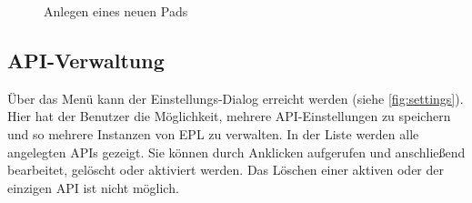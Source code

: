 \begin{figure}[h!]
    \centering
    \setlength\fboxsep{0pt}
	  \caption{Anlegen eines neuen Pads}
	  \label{fig:create}
\end{figure}

\subsection{API-Verwaltung}
Über das Menü kann der Einstellungs-Dialog erreicht werden (siehe \autoref{fig:settings}).
Hier hat der Benutzer die Möglichkeit, mehrere API-Einstellungen zu speichern und so mehrere Instanzen von EPL zu verwalten.
In der Liste werden alle angelegten APIs gezeigt.
Sie können durch Anklicken aufgerufen und anschließend bearbeitet, gelöscht oder aktiviert werden.
Das Löschen einer aktiven oder der einzigen API ist nicht möglich.

